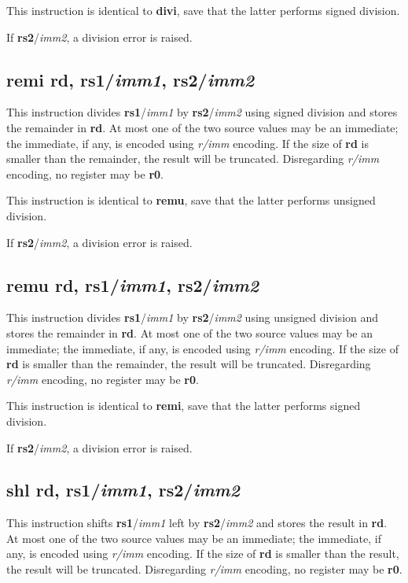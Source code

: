 \documentclass[12pt, a4paper, oneside, final]{article}
\def\i#1{\textcolor{icolour}{\bfseries#1}}
\def\r#1{\textcolor{rcolour}{\bfseries r#1}}
\begin{document}
This instruction is identical to \i{divi}, save that the latter performs signed division.

If \r{s2}/\textit{imm2}, a division error is raised.

\subsection{\i{remi} \r{d}, \r{s1}/\textit{imm1}, \r{s2}/\textit{imm2}}
This instruction divides \r{s1}/\textit{imm1} by \r{s2}/\textit{imm2} using signed division and
stores the remainder in \r{d}. At most one of the two source values may be an immediate; the
immediate, if any, is encoded using \textit{r/imm} encoding. If the size of \r{d} is smaller than
the remainder, the result will be truncated. Disregarding \textit{r/imm} encoding, no register may
be \r{0}.

This instruction is identical to \i{remu}, save that the latter performs unsigned division.

If \r{s2}/\textit{imm2}, a division error is raised.

\subsection{\i{remu} \r{d}, \r{s1}/\textit{imm1}, \r{s2}/\textit{imm2}}
This instruction divides \r{s1}/\textit{imm1} by \r{s2}/\textit{imm2} using unsigned division and
stores the remainder in \r{d}. At most one of the two source values may be an immediate; the
immediate, if any, is encoded using \textit{r/imm} encoding. If the size of \r{d} is smaller than
the remainder, the result will be truncated. Disregarding \textit{r/imm} encoding, no register may
be \r{0}.

This instruction is identical to \i{remi}, save that the latter performs signed division.

If \r{s2}/\textit{imm2}, a division error is raised.

\subsection{\i{shl} \r{d}, \r{s1}/\textit{imm1}, \r{s2}/\textit{imm2}}
This instruction shifts \r{s1}/\textit{imm1} left by \r{s2}/\textit{imm2} and stores the result in
\r{d}. At most one of the two source values may be an immediate; the immediate, if any, is encoded
using \textit{r/imm} encoding. If the size of \r{d} is smaller than the result, the result will be
truncated. Disregarding \textit{r/imm} encoding, no register may be \r{0}.
\end{document}
